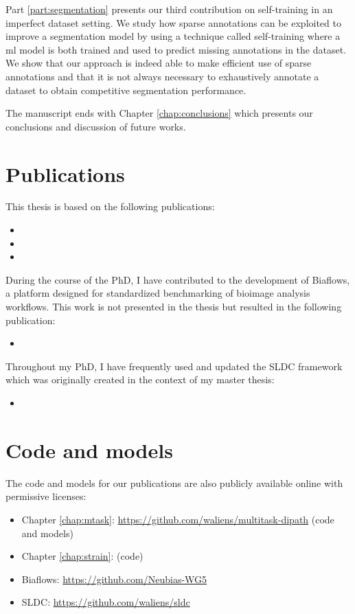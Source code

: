 Part \ref{part:segmentation} presents our third contribution on self-training in an imperfect dataset setting. We study how sparse annotations can be exploited to improve a segmentation model by using a technique called self-training where a \acrlong{ml} model is both trained and used to predict missing annotations in the dataset. We show that our approach is indeed able to make efficient use of sparse annotations and that it is not always necessary to exhaustively annotate a dataset to obtain competitive segmentation performance. 

The manuscript ends with Chapter \ref{chap:conclusions} which presents our conclusions and discussion of future works.

\section{Publications}

This thesis is based on the following publications:
\begin{itemize}
  \item {}
  \item {}
  \item {}
\end{itemize}

During the course of the PhD, I have contributed to the development of Biaflows, a platform designed for standardized benchmarking of bioimage analysis workflows. This work is not presented in the thesis but resulted in the following publication: 
\begin{itemize}
  \item {}
\end{itemize}

Throughout my PhD, I have frequently used and updated the SLDC framework which was originally created in the context of my master thesis:
\begin{itemize}
  \item {}
\end{itemize}

\section{Code and models}

The code and models for our publications are also publicly available online with permissive licenses:
\begin{itemize}
  \item Chapter \ref{chap:mtask}: \url{https://github.com/waliens/multitask-dipath} (code and models)
  \item Chapter \ref{chap:strain}:  (code)
  \item Biaflows: \url{https://github.com/Neubias-WG5}
  \item SLDC: \url{https://github.com/waliens/sldc}
\end{itemize}

